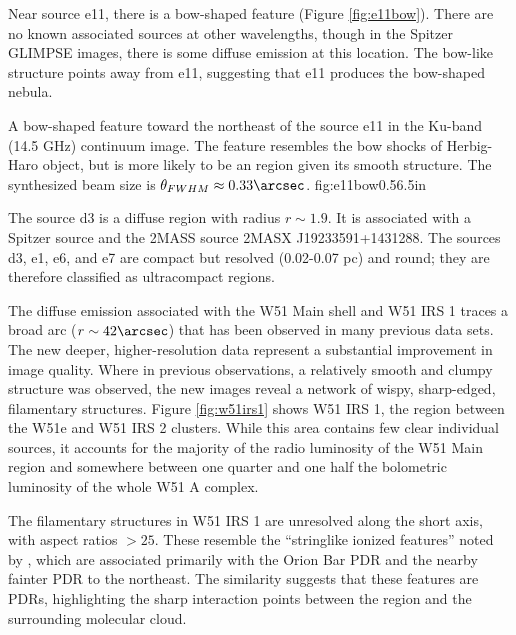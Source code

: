 Near source e11, there is a bow-shaped feature (Figure \ref{fig:e11bow}).
There are no known associated sources at other wavelengths, though in the
Spitzer GLIMPSE
\citep{Benjamin2003a} images, there is some diffuse emission at this location.
The bow-like structure points away from e11, suggesting that e11 produces the
bow-shaped nebula.

{A bow-shaped feature toward the northeast of the source e11 in the Ku-band
(14.5 GHz)
continuum image.  The feature resembles the bow shocks of Herbig-Haro object,
but is more likely to be an \hii region given its smooth structure.
The synthesized beam size is
$\theta_{FWHM}\approx0.33\arcsec$.
}
{fig:e11bow}{0.5}{6.5in}

The source d3 is a diffuse \hii region with radius $r\sim1.9$\arcsec.  It is
associated with a Spitzer source and the 2MASS source 2MASX J19233591+1431288.
The sources d3, e1, e6, and e7 are compact but resolved (0.02-0.07 pc) and
round; they are therefore classified as ultracompact \hii regions.

The diffuse emission associated with the W51 Main shell and W51 IRS 1 traces a broad arc
($r\sim42\arcsec$) that has been observed in many previous data sets.  The new
deeper, higher-resolution data represent a substantial improvement in image
quality.  Where in previous observations, a relatively smooth and clumpy
structure was observed, the new images reveal a network of wispy, sharp-edged,
filamentary structures.  Figure \ref{fig:w51irs1} shows W51 IRS 1, the
region between the W51e and
W51 IRS 2 clusters.  While this area contains few clear individual sources, it
accounts for the majority of the radio luminosity of the W51 Main region and
somewhere between one quarter and one half the bolometric luminosity of the
whole W51 A complex.

The filamentary structures in W51 IRS 1 are unresolved along the short
axis, with aspect ratios $>25$.   These resemble the ``stringlike ionized
features'' noted by \citet[][see
\url{http://images.nrao.edu/402}]{Yusef-Zadeh1990a}, which are associated
primarily with the Orion Bar PDR and the nearby fainter PDR to the northeast.
The similarity suggests that these features are PDRs, highlighting the sharp
interaction points between the \hii region and the surrounding molecular cloud.

